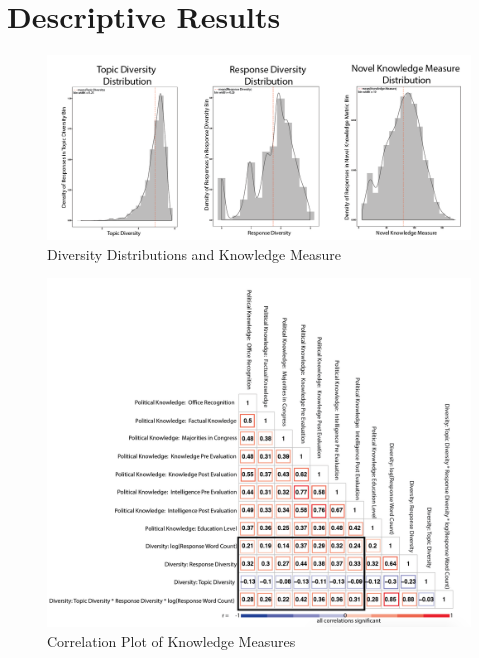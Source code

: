 \documentclass[12pt]{article}
\begin{document}
\section{Descriptive Results}


\begin{figure}
\includegraphics[width=\textwidth]{../fig/diversity_distributions.png}
\caption{Diversity Distributions and Knowledge Measure}
\end{figure}

\begin{figure}
\includegraphics[width=\textwidth]{../fig/corr_fixed_data.png}
\caption{Correlation Plot of Knowledge Measures}
\end{figure}
\end{document}
